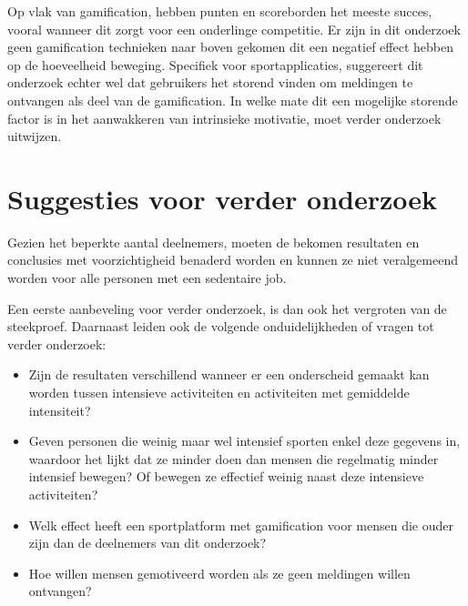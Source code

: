 Op vlak van gamification, hebben punten en scoreborden het meeste succes, vooral wanneer dit zorgt voor een onderlinge competitie. Er zijn in dit onderzoek geen gamification technieken naar boven gekomen dit een negatief effect hebben op de hoeveelheid beweging. Specifiek voor sportapplicaties, suggereert dit onderzoek echter wel dat gebruikers het storend vinden om meldingen te ontvangen als deel van de gamification. In welke mate dit een mogelijke storende factor is in het aanwakkeren van intrinsieke motivatie, moet verder onderzoek uitwijzen.

\section{Suggesties voor verder onderzoek}

Gezien het beperkte aantal deelnemers, moeten de bekomen resultaten en conclusies met voorzichtigheid benaderd worden en kunnen ze niet veralgemeend worden voor alle personen met een sedentaire job.

Een eerste aanbeveling voor verder onderzoek, is dan ook het vergroten van de steekproef. Daarnaast leiden ook de volgende onduidelijkheden of vragen tot verder onderzoek:

\begin{itemize}
    \item Zijn de resultaten verschillend wanneer er een onderscheid gemaakt kan worden tussen intensieve activiteiten en activiteiten met gemiddelde intensiteit?
    \item Geven personen die weinig maar wel intensief sporten enkel deze gegevens in, waardoor het lijkt dat ze minder doen dan mensen die regelmatig minder intensief bewegen? Of bewegen ze effectief weinig naast deze intensieve activiteiten?
    \item Welk effect heeft een sportplatform met gamification voor mensen die ouder zijn dan de deelnemers van dit onderzoek?
    \item Hoe willen mensen gemotiveerd worden als ze geen meldingen willen ontvangen?
\end{itemize}